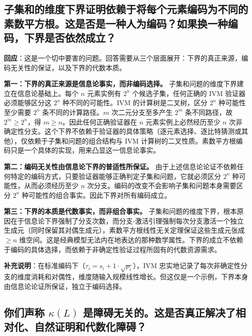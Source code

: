 \documentclass{ctexart}
\begin{document}
	
	\subsection{子集和的维度下界证明依赖于将每个元素编码为不同的素数平方根。这是否是一种人为编码？如果换一种编码，下界是否依然成立？}
	
	\textbf{回应}：这是一个切中要害的问题。回答需要从三个层面展开：下界的真正来源，编码无关性的保证，以及下界的代数本质。
	
	\textbf{第一：下界的真正来源是信息论事实，而非编码选择。} 子集和问题的维度下界建立在信息论基础上。每个 $n$ 元素实例有 $2^n$ 个候选子集，任何正确的 IVM 验证器必须能够区分这 $2^n$ 种不同的可能性。IVM 的计算树是二叉树，区分 $2^n$ 种可能性至少需要 $2^n$ 条不同的计算路径。$m$ 次二元分支至多产生 $2^m$ 条不同路径，故 $2^m \ge 2^n$，得 $m \ge n$。因此任何正确验证器在 $n$ 元素实例上必然经历至少 $n$ 次非确定性分支。这个下界不依赖于验证器的具体策略（逐元素选择、逐比特猜测或其他），仅依赖于子集和问题的组合结构与 IVM 计算树的二叉性质。素数平方根编码只是一个具体的实现，用来凸显这一信息论事实。
	
	\textbf{第二：编码无关性由信息论下界的普适性所保证。} 由于上述信息论论证不依赖任何特定的编码方式，只要验证器能够正确判定子集和问题，它就必须区分 $2^n$ 种可能性，从而必须经历至少 $n$ 次分支。编码的改变不会影响子集和问题本身需要区分 $2^n$ 种可能性的组合事实。因此下界对所有编码成立。
	
	\textbf{第三：下界的本质是代数事实，而非组合事实。} 子集和问题的维度下界，根本原因在于信息论下界强制了分支次数，而分支-激活引理强制每次分支激活一个独立生成元（同时保留其对偶生成元），素数平方根线性无关定理保证这些生成元张成 $\ge n$ 维空间。这是经典模型无法内在地表达的那种数学属性。下界的成立不依赖于编码的具体选择，而依赖于非确定性验证过程所固有的代数资源需求。
	
	\textbf{补充说明}：在标准编码下（$\tau_i = s_i + 1 \cdot \sqrt{p_i}$），IVM 忠实地记录了每次非确定性分支的维度消耗和对偶性，维度随输入规模线性增长。但这仅是一个示例，下界本身由信息论论证所保证，独立于编码选择。
	
	
	\subsection{你们声称 $\kappa(L)$ 是障碍无关的。这是否真正解决了相对化、自然证明和代数化障碍？}
	
\end{document}
